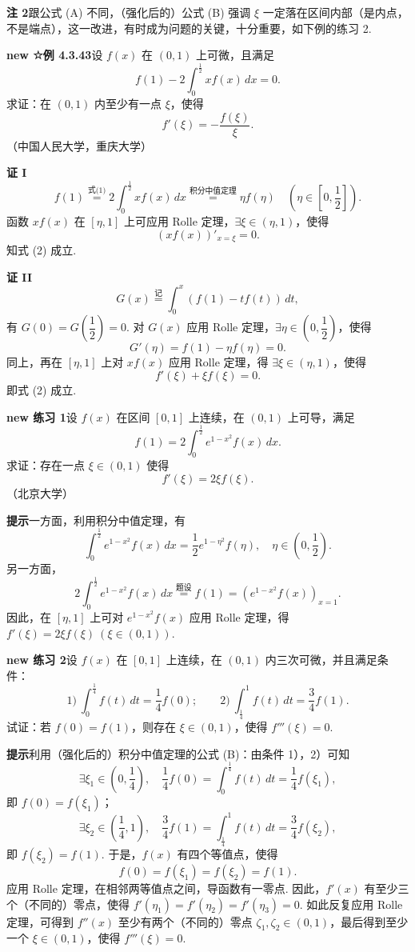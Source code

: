 \documentclass[UTF8, 12pt, fontset=fandol, oneside]{ctexart}
\begin{document}
\noindent\textbf{注 2}\quad 跟公式 (A) 不同，（强化后的）公式 (B) 强调 $\xi$ 一定落在区间内部（是内点，不是端点），这一改进，有时成为问题的关键，十分重要，如下例的练习 2.

\noindent\textbf{new ☆例 4.3.43}\quad 设 $f(x)$ 在 $(0,1)$ 上可微，且满足
\[
f(1)-2\int_0^{\frac12}xf(x)\,dx=0.
\tag{1}
\]
求证：在 $(0,1)$ 内至少有一点 $\xi$，使得
\[
f'(\xi)=-\frac{f(\xi)}{\xi}.
\tag{2}
\]
（中国人民大学，重庆大学）

\noindent\textbf{证 I}\quad
\[
f(1)\stackrel{\text{式(1)}}{=}2\int_0^{\frac12}xf(x)\,dx
\stackrel{\text{积分中值定理}}{=}\eta f(\eta)\quad
\left(\eta\in\left[0,\frac12\right]\right).
\]
函数 $xf(x)$ 在 $[\eta,1]$ 上可应用 Rolle 定理，$\exists\xi\in(\eta,1)$，使得
\[
(xf(x))'_{x=\xi}=0.
\]
知式 (2) 成立.

\noindent\textbf{证 II}\quad
\[
G(x)\stackrel{\text{记}}{=}\int_0^x(f(1)-tf(t))\,dt,
\]
有 $G(0)=G\left(\dfrac12\right)=0$. 对 $G(x)$ 应用 Rolle 定理，$\exists\eta\in\left(0,\dfrac12\right)$，使得
\[
G'(\eta)=f(1)-\eta f(\eta)=0.
\]
同上，再在 $[\eta,1]$ 上对 $xf(x)$ 应用 Rolle 定理，得 $\exists\xi\in(\eta,1)$，使得
\[
f'(\xi)+\xi f(\xi)=0.
\]
即式 (2) 成立.

\noindent\textbf{new 练习 1}\quad 设 $f(x)$ 在区间 $[0,1]$ 上连续，在 $(0,1)$ 上可导，满足
\[
f(1)=2\int_0^{\frac12}e^{1-x^2}f(x)\,dx.
\]
求证：存在一点 $\xi\in(0,1)$ 使得
\[
f'(\xi)=2\xi f(\xi).
\]
（北京大学）

\noindent\textbf{提示}\quad 一方面，利用积分中值定理，有
\[
\int_0^{\frac12}e^{1-x^2}f(x)\,dx=\frac12 e^{1-\eta^2}f(\eta),\quad
\eta\in\left(0,\frac12\right).
\]
另一方面，
\[
2\int_0^{\frac12}e^{1-x^2}f(x)\,dx\stackrel{\text{题设}}{=}f(1)
=\left(e^{1-x^2}f(x)\right)_{x=1}.
\]
因此，在 $[\eta,1]$ 上可对 $e^{1-x^2}f(x)$ 应用 Rolle 定理，得
$f'(\xi)=2\xi f(\xi)\ (\xi\in(0,1))$.

\noindent\textbf{new 练习 2}\quad 设 $f(x)$ 在 $[0,1]$ 上连续，在 $(0,1)$ 内三次可微，并且满足条件：
\[
1)\ \int_0^{\frac14}f(t)\,dt=\frac14f(0);\qquad
2)\ \int_{\frac14}^1f(t)\,dt=\frac34f(1).
\]
试证：若 $f(0)=f(1)$，则存在 $\xi\in(0,1)$，使得 $f'''(\xi)=0$.

\noindent\textbf{提示}\quad 利用（强化后的）积分中值定理的公式 (B)：由条件 1），2）可知
\[
\exists\xi_1\in\left(0,\frac14\right),\quad
\frac14f(0)=\int_0^{\frac14}f(t)\,dt=\frac14f(\xi_1),
\]
即 $f(0)=f(\xi_1)$；
\[
\exists\xi_2\in\left(\frac14,1\right),\quad
\frac34f(1)=\int_{\frac14}^1f(t)\,dt=\frac34f(\xi_2),
\]
即 $f(\xi_2)=f(1)$.
于是，$f(x)$ 有四个等值点，使得
\[
f(0)=f(\xi_1)=f(\xi_2)=f(1).
\]
应用 Rolle 定理，在相邻两等值点之间，导函数有一零点. 因此，$f'(x)$ 有至少三个（不同的）零点，使得
$f'(\eta_1)=f'(\eta_2)=f'(\eta_3)=0$. 如此反复应用 Rolle 定理，可得到 $f''(x)$ 至少有两个（不同的）零点 $\zeta_1,\zeta_2\in(0,1)$，最后得到至少一个 $\xi\in(0,1)$，使得 $f'''(\xi)=0$.
\end{document}
